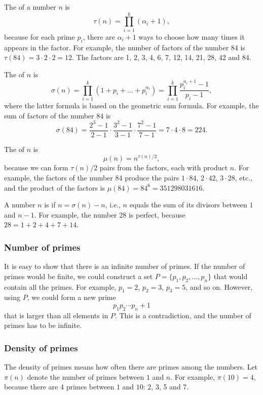 The  of a number $n$ is
\[\tau(n)=\prod_{i=1}^k (\alpha_i+1),\]
because for each prime $p_i$, there are
$\alpha_i+1$ ways to choose how many times
it appears in the factor.
For example, the number of factors
of the number 84 is
$\tau(84)=3 \cdot 2 \cdot 2 = 12$.
The factors are
1, 2, 3, 4, 6, 7, 12, 14, 21, 28, 42 and 84.

The  of $n$ is
\[\sigma(n)=\prod_{i=1}^k (1+p_i+\ldots+p_i^{\alpha_i}) = \prod_{i=1}^k \frac{p_i^{a_i+1}-1}{p_i-1},\]
where the latter formula is based on the geometric sum formula.
For example, the sum of factors of the number 84 is
\[\sigma(84)=\frac{2^3-1}{2-1} \cdot \frac{3^2-1}{3-1} \cdot \frac{7^2-1}{7-1} = 7 \cdot 4 \cdot 8 = 224.\]

The  of $n$ is
\[\mu(n)=n^{\tau(n)/2},\]
because we can form $\tau(n)/2$ pairs from the factors,
each with product $n$.
For example, the factors of the number 84
produce the pairs
$1 \cdot 84$, $2 \cdot 42$, $3 \cdot 28$, etc.,
and the product of the factors is $\mu(84)=84^6=351298031616$.


A number $n$ is  if $n=\sigma(n)-n$,
i.e., $n$ equals the sum of its divisors
between $1$ and $n-1$.
For example, the number 28 is perfect,
because $28=1+2+4+7+14$.

\subsubsection{Number of primes}

It is easy to show that there is an infinite number
of primes.
If the number of primes would be finite,
we could construct a set $P=\{p_1,p_2,\ldots,p_n\}$
that would contain all the primes.
For example, $p_1=2$, $p_2=3$, $p_3=5$, and so on.
However, using $P$, we could form a new prime
\[p_1 p_2 \cdots p_n+1\]
that is larger than all elements in $P$.
This is a contradiction, and the number of primes
has to be infinite.

\subsubsection{Density of primes}

The density of primes means how often there are primes
among the numbers.
Let $\pi(n)$ denote the number of primes between
$1$ and $n$. For example, $\pi(10)=4$, because
there are 4 primes between $1$ and $10$: 2, 3, 5 and 7.

